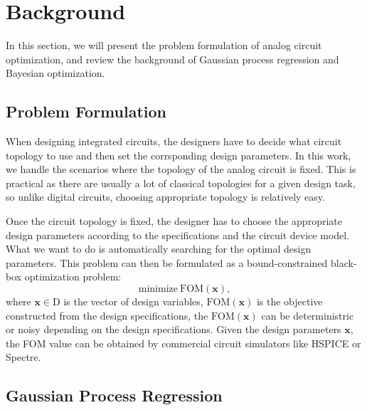\section{Background}

In this section, we will present the problem formulation of analog circuit optimization, and review the background of Gaussian process regression and Bayesian optimization.

\subsection{Problem Formulation}

When designing integrated circuits, the designers have to decide what circuit
topology to use and then set the corrsponding design parameters. In this work,
we handle the scenarios where the topology of the analog circuit is fixed. This
is practical as there are usually a lot of classical topologies for a given
design task, so unlike digital circuits, choosing appropriate topology is
relatively easy. 

Once the circuit topology is fixed, the designer has to choose the appropriate
design parameters according to the specifications and the circuit device model.
What we want to do is automatically searching for the optimal design
parameters. This problem can then be formulated as a bound-constrained
black-box optimization problem:
\begin{equation}
    \label{eq:Formulation}
    \text{minimize}~\mathrm{FOM}(\bm{x}),
\end{equation}
where $\bm{x} \in \textrm{D}$ is the vector of design variables,
$\mathrm{FOM}(\bm{x})$ is the objective constructed from the design
specifications, the $\mathrm{FOM}(\bm{x})$ can be deterministric or noisy
depending on the design specifications. Given the design parameters $\bm{x}$,
the FOM value can be obtained by commercial circuit simulators like HSPICE or
Spectre.

\subsection{Gaussian Process Regression}


